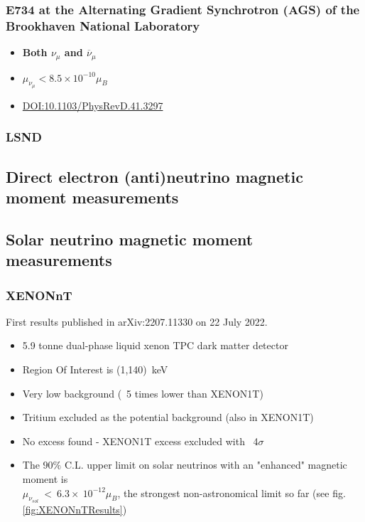 \subsubsection{E734 at the Alternating Gradient Synchrotron (AGS) of the Brookhaven National Laboratory}
\begin{itemize}
    \item \textbf{Both $\nu_\mu$ and $\overline{\nu}_\mu$}
    \item $\mu_{\nu_\mu}<8.5\times 10^{-10}\mu_B$
    \item \href{https://journals.aps.org/prd/abstract/10.1103/PhysRevD.41.3297}{DOI:10.1103/PhysRevD.41.3297}
\end{itemize}

\subsubsection{LSND}

\subsection{Direct electron (anti)neutrino magnetic moment measurements}

\subsection{Solar neutrino magnetic moment measurements}
\subsubsection{XENONnT}
First results published in arXiv:2207.11330\cite{XENONnTFirstResults2022_OfficialPaper.pdf} on 22 July 2022.
\begin{itemize}
    \item 5.9 tonne dual-phase liquid xenon TPC dark matter detector
    \item Region Of Interest is (1,140)~keV
    \item Very low background (~5 times lower than XENON1T)
    \item Tritium excluded as the potential background (also in XENON1T)
    \item No excess found - XENON1T excess excluded with ~4$\sigma$
    \item The $90\%$ C.L. upper limit on solar neutrinos with an "enhanced" magnetic moment is \\$\mu_{\nu_{sol}}~<~6.3\times~10^{-12}\mu_B$, the strongest non-astronomical limit so far (see fig.\ref{fig:XENONnTResults})
\end{itemize}

